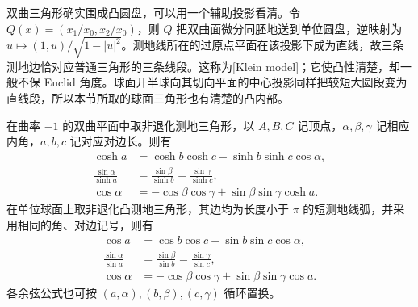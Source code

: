\ProseParagraphBreak

双曲三角形确实围成凸圆盘，可以用一个辅助投影看清。令 \(Q(x)=(x_1/x_0,x_2/x_0)\)，则 \(Q\) 把双曲面微分同胚地送到单位圆盘，逆映射为 \(u\mapsto(1,u)/\sqrt{1-|u|^2}\)。测地线所在的过原点平面在该投影下成为直线，故三条测地边恰对应普通三角形的三条线段。这称为[Klein model]；它使凸性清楚，却一般不保 Euclid 角度。球面开半球向其切向平面的中心投影同样把较短大圆段变为直线段，所以本节所取的球面三角形也有清楚的凸内部。

\begin{theorem}
	\label{g1:thm:constant-curvature-trigonometry}
	在曲率 \(-1\) 的双曲平面中取非退化测地三角形，以 \(A,B,C\) 记顶点，\(\alpha,\beta,\gamma\) 记相应内角，\(a,b,c\) 记对应对边长。则有
	\begin{align}
		\cosh a&=\cosh b\cosh c-\sinh b\sinh c\cos\alpha,
		\label{g1:eq:hyperbolic-cosine-law}\\
		\frac{\sin\alpha}{\sinh a}&=\frac{\sin\beta}{\sinh b}=\frac{\sin\gamma}{\sinh c},
		\label{g1:eq:hyperbolic-sine-law}\\
		\cos\alpha&=-\cos\beta\cos\gamma+\sin\beta\sin\gamma\cosh a.
		\label{g1:eq:hyperbolic-angle-cosine-law}
	\end{align}
	在单位球面上取非退化凸测地三角形，其边均为长度小于 \(\pi\) 的短测地线弧，并采用相同的角、对边记号，则有
	\begin{align}
		\cos a&=\cos b\cos c+\sin b\sin c\cos\alpha,
		\label{g1:eq:spherical-cosine-law}\\
		\frac{\sin\alpha}{\sin a}&=\frac{\sin\beta}{\sin b}=\frac{\sin\gamma}{\sin c},
		\label{g1:eq:spherical-sine-law}\\
		\cos\alpha&=-\cos\beta\cos\gamma+\sin\beta\sin\gamma\cos a.
		\label{g1:eq:spherical-angle-cosine-law}
	\end{align}
	各余弦公式也可按 \((a,\alpha),(b,\beta),(c,\gamma)\) 循环置换。
\end{theorem}
